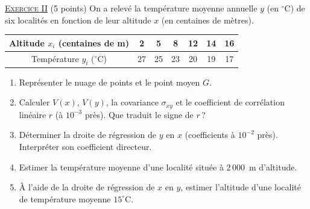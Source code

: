 \noindent \underline{\textsc{Exercice II}} (5 points) \newline
On a relev\'e la temp\'erature moyenne annuelle $y$ (en $^\circ$C) de six localit\'es en fonction de leur altitude $x$
(en centaines de m\`etres).
\begin{center}
\begin{tabular}{|c|c|c|c|c|c|c|}
\hline
Altitude $x_i$ (centaines de m) & 2 & 5 & 8 & 12 & 14 & 16 \\
\hline
Temp\'erature $y_i$ ($^\circ$C) & 27 & 25 & 23 & 20 & 19 & 17 \\
\hline
\end{tabular}
\end{center}
\begin{enumerate}
      \item Repr\'esenter le nuage de points et le point moyen $G$.
      \item Calculer $V(x)$, $V(y)$, la covariance $\sigma_{xy}$ et le coefficient de corr\'elation lin\'eaire $r$ (\`a $10^{-3}$ pr\`es).
            Que traduit le signe de $r$\,?
      \item D\'eterminer la droite de r\'egression de $y$ en $x$ (coefficients \`a $10^{-2}$ pr\`es).
            Interpr\'eter son coefficient directeur.
      \item Estimer la temp\'erature moyenne d'une localit\'e situ\'ee \`a 2\,000~m d'altitude.
      \item \`A l'aide de la droite de r\'egression de $x$ en $y$, estimer l'altitude d'une localit\'e
            de temp\'erature moyenne $15^\circ$C.
\end{enumerate}

